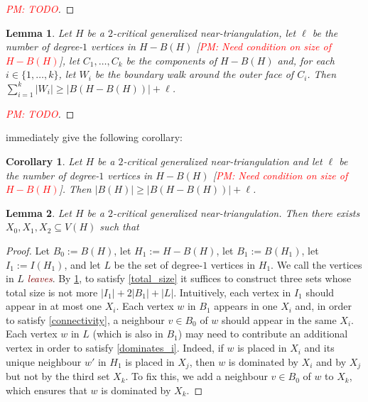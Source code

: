 \documentclass[12pt]{article}
\newtheorem{lem}{Lemma}
\newtheorem{cor}{Corollary}
\newcommand{\defin}[1]{\emph{\textcolor{Maroon}{#1}}}
\theoremstyle{definition}
\newcommand{\pat}[1]{[\textcolor{red}{PM: #1}]}
\begin{document}
\begin{proof}
  \pat{TODO}
\end{proof}



\begin{lem}\label{walk_vs_leaves}
  Let $H$ be a $2$-critical generalized near-triangulation, let $\ell$ be the number of degree-$1$ vertices in $H-B(H)$ \pat{Need condition on size of $H-B(H)$}, let $C_1,\ldots,C_k$ be the components of $H-B(H)$ and, for each $i\in\{1,\ldots,k\}$, let $W_i$ be the boundary walk around the outer face of $C_i$. Then $\sum_{i=1}^k |W_i|\ge |B(H-B(H))|+\ell$.
\end{lem}

\begin{proof}
 \pat{TODO}
\end{proof}

 immediately give the following corollary:

\begin{cor}\label{boundary_vs_leaves}
  Let $H$ be a $2$-critical generalized near-triangulation and let $\ell$ be the number of degree-$1$ vertices in $H-B(H)$ \pat{Need condition on size of $H-B(H)$}. Then $|B(H)|\ge |B(H-B(H))|+\ell$.
\end{cor}


\begin{lem}
  Let $H$ be a $2$-critical generalized near-triangulation.  Then there exists $X_0,X_1,X_2\subseteq V(H)$ such that
\end{lem}

\begin{proof}
  Let $B_0:=B(H)$, let $H_1:=H-B(H)$, let $B_1:=B(H_1)$, let $I_1:=I(H_1)$, and let $L$ be the set of degree-$1$ vertices in $H_1$.  We call the vertices in $L$ \defin{leaves}.
  By \cref{boundary_vs_leaves}, to satisfy \cref{total_size} it suffices to construct three sets whose total size is not more $|I_1|+2|B_1|+|L|$.  Intuitively, each vertex in $I_1$ should appear in at most one $X_i$. Each vertex $w$ in $B_1$ appears in one $X_i$ and, in order to satisfy \cref{connectivity}, a neighbour $v\in B_0$ of $w$ should appear in the same $X_i$.  Each vertex $w$ in $L$ (which is also in $B_1$) may need to contribute an additional vertex in order to satisfy \cref{dominates_i}.  Indeed, if $w$ is placed in $X_i$ and its unique neighbour $w'$ in $H_1$ is placed in $X_j$, then $w$ is dominated by $X_i$ and by $X_j$ but not by the third set $X_k$. To fix this, we add a neighbour $v\in B_0$ of $w$ to $X_k$, which ensures that $w$ is dominated by $X_k$.
\end{proof}
\end{document}
